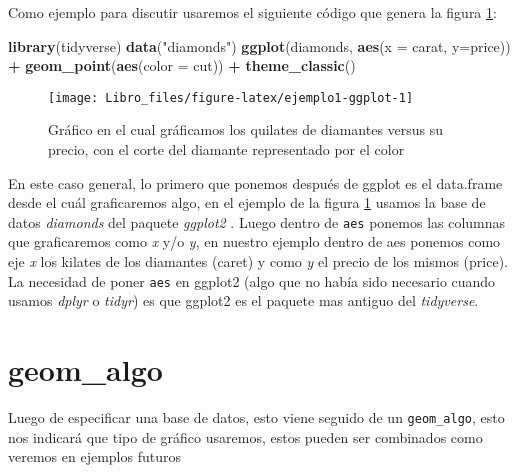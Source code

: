 \documentclass[]{book}
\newenvironment{Shaded}{\begin{snugshade}}{\end{snugshade}}
\newcommand{\DataTypeTok}[1]{\textcolor[rgb]{0.13,0.29,0.53}{#1}}
\newcommand{\KeywordTok}[1]{\textcolor[rgb]{0.13,0.29,0.53}{\textbf{#1}}}
\newcommand{\NormalTok}[1]{#1}
\newcommand{\OperatorTok}[1]{\textcolor[rgb]{0.81,0.36,0.00}{\textbf{#1}}}
\newcommand{\StringTok}[1]{\textcolor[rgb]{0.31,0.60,0.02}{#1}}
\begin{document}
Como ejemplo para discutir usaremos el siguiente código que genera la
figura \ref{fig:ejemplo1-ggplot}:

\begin{Shaded}
\begin{Highlighting}[]
\KeywordTok{library}\NormalTok{(tidyverse)}
\KeywordTok{data}\NormalTok{(}\StringTok{"diamonds"}\NormalTok{)}
\KeywordTok{ggplot}\NormalTok{(diamonds, }\KeywordTok{aes}\NormalTok{(}\DataTypeTok{x =}\NormalTok{ carat, }\DataTypeTok{y=}\NormalTok{price)) }\OperatorTok{+}\StringTok{ }\KeywordTok{geom_point}\NormalTok{(}\KeywordTok{aes}\NormalTok{(}\DataTypeTok{color =}\NormalTok{ cut)) }\OperatorTok{+}\StringTok{ }\KeywordTok{theme_classic}\NormalTok{()}
\end{Highlighting}
\end{Shaded}

\begin{figure}

{\centering \texttt{[image: Libro\_files/figure-latex/ejemplo1-ggplot-1]} 

}

\caption{Gráfico en el cual gráficamos los quilates de diamantes versus su precio, con el corte del diamante representado por el color}\label{fig:ejemplo1-ggplot}
\end{figure}

En este caso general, lo primero que ponemos después de ggplot es el
data.frame desde el cuál graficaremos algo, en el ejemplo de la figura
\ref{fig:ejemplo1-ggplot} usamos la base de datos \emph{diamonds} del
paquete \emph{ggplot2} \citep{Wickhamggplot}. Luego dentro de
\texttt{aes} ponemos las columnas que graficaremos como \emph{x} y/o
\emph{y}, en nuestro ejemplo dentro de aes ponemos como eje \emph{x} los
kilates de los diamantes (caret) y como \emph{y} el precio de los mismos
(price). La necesidad de poner \texttt{aes} en ggplot2 (algo que no
había sido necesario cuando usamos \emph{dplyr} o \emph{tidyr}) es que
ggplot2 es el paquete mas antiguo del \emph{tidyverse}.

\hypertarget{geom_algo}{%
\section{geom\_algo}\label{geom_algo}}

Luego de especificar una base de datos, esto viene seguido de un
\texttt{geom\_algo}, esto nos indicará que tipo de gráfico usaremos,
estos pueden ser combinados como veremos en ejemplos futuros
\end{document}
